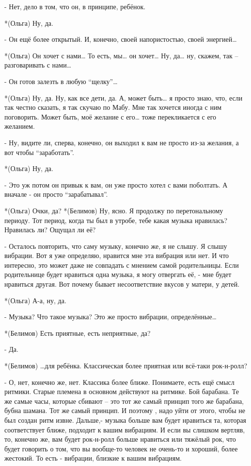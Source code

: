 - Нет, дело в том, что он, в принципе, ребёнок.

*(Ольга) Ну, да.

- Он ещё более открытый. И, конечно, своей напористостью, своей энергией…

*(Ольга) Он хочет с нами… То есть, мы… он хочет… Ну, да… ну, скажем, так – разговаривать с нами…

- Он готов залезть в любую “щелку”…

*(Ольга) Ну, да. Ну, как все дети, да. А, может быть… я просто знаю, что, если так честно сказать, я так скучаю по Мабу. Мне так хочется иногда с ним поговорить. Может быть, моё желание с его… тоже перекликается с его желанием.

- Ну, видите ли, сперва, конечно, он выходил к вам не просто из-за желания, а вот чтобы “заработать”.

*(Ольга) Ну, да.

- Это уж потом он привык к вам, он уже просто хотел с вами поболтать. А вначале - он просто “зарабатывал”.

*(Ольга) Очки, да?
*(Белимов) Ну, ясно. Я продолжу по перетональному периоду. Тот период, когда ты был в утробе, тебе какая музыка нравилась? Нравилась ли? Ощущал ли её?

- Осталось повторить, что саму музыку, конечно же, я не слышу. Я слышу вибрации. Вот я уже определяю, нравится мне эта вибрация или нет. И что интересно, это может даже не совпадать с мнением самой родительницы. Если родительнице будет нравиться одна музыка, я могу отвергать её, - мне будет нравиться другая. Вот почему бывает несоответствие вкусов у матери, у детей.

*(Ольга) А-а, ну, да.

- Музыка? Что такое музыка? Это же просто вибрации, определённые…

*(Белимов) Есть приятные, есть неприятные, да?

- Да.

*(Белимов) …для ребёнка. Классическая более приятная или всё-таки рок-н-ролл?

- О, нет, конечно же, нет. Классика более ближе. Понимаете, есть ещё смысл ритмики. Старые племена в основном действуют на ритмике. Бой барабана. Те же самые часы, которые сбивают – это тот же самый принцип того же барабана, бубна шамана. Тот же самый принцип. И поэтому , надо уйти от этого, чтобы не был создан ритм извне. Дальше,- музыка больше вам будет нравиться та, которая соответствует ближе, подходит к вашим вибрациям. И если вы слишком вертляв, то, конечно же, вам будет рок-н-ролл больше нравиться или тяжёлый рок, что будет говорить о том, что вы вообще-то человек не очень-то и хороший, более жестокий. То есть - вибрации, близкие к вашим вибрациям.

